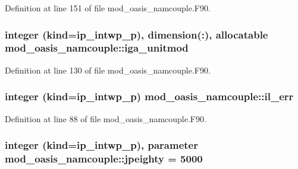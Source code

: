 Definition at line 151 of file mod\+\_\+oasis\+\_\+namcouple.\+F90.

\hypertarget{classmod__oasis__namcouple_adb532de2f5268d0e40ae162999dbe2ff}{
\subsubsection[{iga\+\_\+unitmod}]{\setlength{\rightskip}{0pt plus 5cm}integer (kind=ip\+\_\+intwp\+\_\+p), dimension(\+:), allocatable mod\+\_\+oasis\+\_\+namcouple\+::iga\+\_\+unitmod\hspace{0.3cm}{\ttfamily [private]}}}\label{classmod__oasis__namcouple_adb532de2f5268d0e40ae162999dbe2ff}


Definition at line 130 of file mod\+\_\+oasis\+\_\+namcouple.\+F90.

\hypertarget{classmod__oasis__namcouple_a18b7a14f095f3cb6ace40afc06e2a5b9}{
\subsubsection[{il\+\_\+err}]{\setlength{\rightskip}{0pt plus 5cm}integer (kind=ip\+\_\+intwp\+\_\+p) mod\+\_\+oasis\+\_\+namcouple\+::il\+\_\+err\hspace{0.3cm}{\ttfamily [private]}}}\label{classmod__oasis__namcouple_a18b7a14f095f3cb6ace40afc06e2a5b9}


Definition at line 88 of file mod\+\_\+oasis\+\_\+namcouple.\+F90.

\hypertarget{classmod__oasis__namcouple_a4fb10ad6e864dcbe34c4a8b02204a523}{
\subsubsection[{jpeighty}]{\setlength{\rightskip}{0pt plus 5cm}integer (kind=ip\+\_\+intwp\+\_\+p), parameter mod\+\_\+oasis\+\_\+namcouple\+::jpeighty = 5000\hspace{0.3cm}{\ttfamily [private]}}}\label{classmod__oasis__namcouple_a4fb10ad6e864dcbe34c4a8b02204a523}


